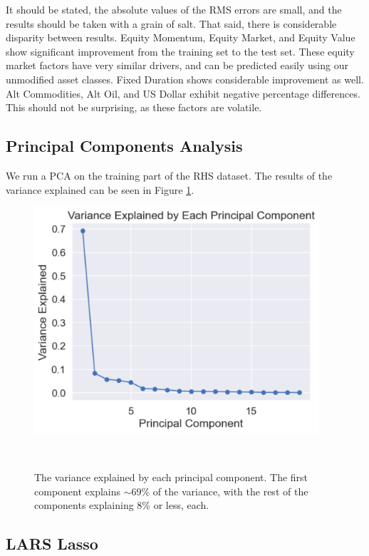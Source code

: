 \documentclass{ledger}
\begin{document}
It should be stated, the absolute values of the RMS errors are small, and the results should be taken with a grain of salt. That said, there is considerable disparity between results. Equity Momentum, Equity Market, and Equity Value show significant improvement from the training set to the test set. These equity market factors have very similar drivers, and can be predicted easily using our unmodified asset classes. Fixed Duration shows considerable improvement as well. Alt Commodities, Alt Oil, and US Dollar exhibit negative percentage differences. This should not be surprising, as these factors are volatile. \\

\subsection{Principal Components Analysis}

We run a PCA on the training part of the RHS dataset. The results of the variance explained can be seen in Figure \ref{fig:variance_explained}. \\

\begin{figure}[!ht]
\centering
	\includegraphics[width=300pt]{variance_explained.pdf}
	\caption{The variance explained by each principal component. The first component explains $\sim$69\% of the variance, with the rest of the components explaining 8\% or less, each. \label{fig:variance_explained}} ~\\
\end{figure}

\subsection{LARS Lasso}
\end{document}
